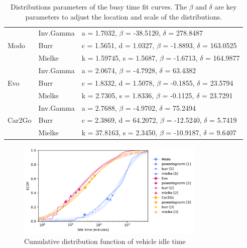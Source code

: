 \begin{table}
\centering
\scriptsize
\begin{tabular}{lll}
\hline
\multirow{3}{*}{Modo}   & Inv.Gamma       & a = 1.7032,  $\beta$ = -38.5120,  $\delta$ = 278.8487                        \\
                        & Burr                & c = 1.5651, d = 1.0327,  $\beta$ = -1.8893, $\delta$ = 163.0525 \\
                        & Mielke & k = 1.59745, s = 1.5687,  $\beta$ = -1.6713, $\delta$ = 164.9877 \\ \hline
\multirow{3}{*}{Evo}    & Inv.Gamma       & a = 2.0674, $\beta$ = -4.7928, $\delta$ = 63.4382                          \\
                        & Burr                & c = 1.8332, d = 1.5078, $\beta$ = -0.1855, $\delta$ = 23.5794   \\
                        & Mielke & k = 2.7305, s = 1.8336, $\beta$ = -0.1125, $\delta$ = 23.7291 \\ \hline
\multirow{3}{*}{Car2Go} & Inv.Gamma       & a = 2.7688, $\beta$ = -4.9702, $\delta$ = 75.2494                           \\
                        & Burr                & c = 2.3869, d = 64.2072, $\beta$ = -12.5240, $\delta$ = 5.7419   \\
                        & Mielke & k = 37.8163, s = 2.3450, $\beta$ = -10.9187, $\delta$ = 9.6407   \\ \hline
\end{tabular}
\caption{Distributions parameters of the busy time fit curves. The $\beta$ and $\delta$ are key parameters to adjust the location and scale of the distributions.}
\label{table:fit_busy}
\end{table}

\begin{figure}
   \centering
   \includegraphics[width=9cm]{images_test/CDF_Fit_idle_final.pdf}
   \caption{Cumulative distribution function of vehicle idle time}
   \label{fig:idle_all_eCDF}
\end{figure}

